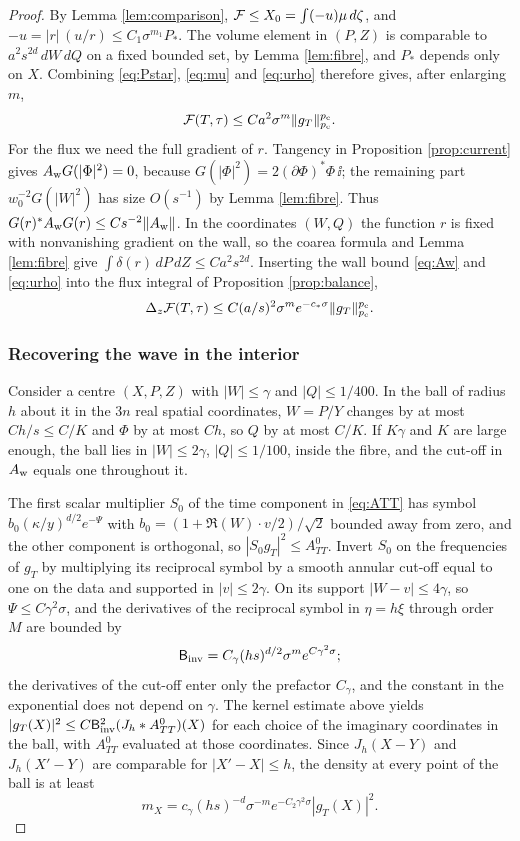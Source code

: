 \begin{proof}
By Lemma \ref{lem:comparison}, $\mathcal F\le X_0=\int(-u)\mu\,d\zeta$, and $-u=|r|\,(u/r)\le C_1\sigma^{m_1}P_*$.
The volume element in $(P,Z)$ is comparable to $a^2s^{2d}\,dW\,dQ$ on a fixed bounded set, by Lemma
\ref{lem:fibre}, and $P_*$ depends only on $X$. Combining \eqref{eq:Pstar}, \eqref{eq:mu} and
\eqref{eq:urho} therefore gives, after enlarging $m$,
\begin{equation}\label{eq:Fup}
\mathcal F(T,\tau)\le Ca^2\sigma^m\|g_T\|_{p_{\mathrm c}}^{p_{\mathrm c}}.
\end{equation}
For the flux we need the full gradient of $r$. Tangency in Proposition \ref{prop:current} gives
$A_{\rm w}G(|\Phi|^2)=0$, because $G(|\Phi|^2)=2(\partial\Phi)^*\Phi\,\ii$; the remaining part
$w_0^{-2}G(|W|^2)$ has size $O(s^{-1})$ by Lemma \ref{lem:fibre}. Thus
$G(r)^*A_{\rm w}G(r)\le Cs^{-2}\|A_{\rm w}\|$. In the coordinates $(W,Q)$ the function $r$ is fixed
with nonvanishing gradient on the wall, so the coarea formula and Lemma \ref{lem:fibre} give
$\int\delta(r)\,dP\,dZ\le Ca^2s^{2d}$. Inserting the wall bound \eqref{eq:Aw} and \eqref{eq:urho}
into the flux integral of Proposition \ref{prop:balance},
\begin{equation}\label{eq:fluxbound}
\Delta_z\mathcal F(T,\tau)\le C(a/s)^2\sigma^me^{-c_*\sigma}\|g_T\|_{p_{\mathrm c}}^{p_{\mathrm c}}.
\end{equation}

\subsubsection*{Recovering the wave in the interior}
Consider a centre $(X,P,Z)$ with $|W|\le\gamma$ and $|Q|\le1/400$. In the ball of radius $h$
about it in the $3n$ real spatial coordinates, $W=P/Y$ changes by at most $Ch/s\le C/K$ and
$\Phi$ by at most $Ch$, so $Q$ by at most $C/K$. If $K\gamma$ and $K$ are large enough, the ball
lies in $|W|\le2\gamma$, $|Q|\le1/100$, inside the fibre, and the cut-off in $A_{\rm w}$ equals one
throughout it.

The first scalar multiplier $S_0$ of the time component in \eqref{eq:ATT} has symbol
$b_0(\kappa/y)^{d/2}e^{-\Psi}$ with $b_0=(1+\Re(W)\cdot v/2)/\sqrt2$ bounded away from zero, and the
other component is orthogonal, so $|S_0g_T|^2\le A^0_{TT}$. Invert $S_0$ on the frequencies of
$g_T$ by multiplying its reciprocal symbol by a smooth annular cut-off equal to one on the data
and supported in $|v|\le2\gamma$. On its support $|W-v|\le4\gamma$, so $\Psi\le C\gamma^2\sigma$, and
the derivatives of the reciprocal symbol in $\eta=h\xi$ through order $M$ are bounded by
\[
\mathsf B_{\rm inv}=C_\gamma(hs)^{d/2}\sigma^me^{C\gamma^2\sigma};
\]
the derivatives of the cut-off enter only the prefactor $C_\gamma$, and the constant in the
exponential does not depend on $\gamma$. The kernel estimate above yields
$|g_T(X)|^2\le C\mathsf B_{\rm inv}^2(J_h*A^0_{TT})(X)$ for each choice of the imaginary coordinates
in the ball, with $A^0_{TT}$ evaluated at those coordinates. Since $J_h(X-Y)$ and $J_h(X'-Y)$ are
comparable for $|X'-X|\le h$, the density at every point of the ball is at least
\begin{equation}\label{eq:mX}
m_X=c_\gamma(hs)^{-d}\sigma^{-m}e^{-C_2\gamma^2\sigma}|g_T(X)|^2 .
\end{equation}


\end{proof}
